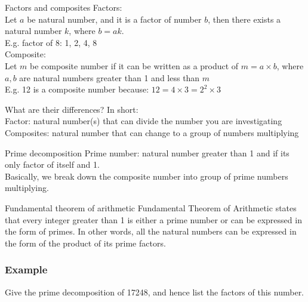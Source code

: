 \documentclass[
	11pt, %
]{beamer}
\begin{document}
\begin{frame}{Factors and composites}
    Factors:\\
    Let $a$ be natural number, and it is a factor of number $b$, then there exists a natural number $k$, where $b = ak$.\\
    \alert{E.g. factor of 8: 1, 2, 4, 8}\\
    Composite:\\
    Let $m$ be composite number if it can be written as a product of $m = a \times b$, where $a, b$ are natural numbers
    greater than 1 and less than $m$\\
    \alert{E.g. 12 is a composite number because: $12 = 4 \times 3 = 2^2 \times 3$}\\

    \begin{block}{What are their differences?}
        In short:\\
        Factor: natural number(s) that can divide the number you are investigating\\
        Composites: natural number that can change to a group of numbers multiplying\\
    \end{block}
\end{frame}

\begin{frame}{Prime decomposition}
    Prime number: natural number greater than 1 and if its only factor of itself and 1.\\
    Basically, we break down the composite number into group of prime numbers multiplying.\\
    \begin{block}{Fundamental theorem of arithmetic}
        Fundamental Theorem of Arithmetic states that every integer greater than 1 is either a prime number or can be expressed in the form of primes. 
        In other words, all the natural numbers can be expressed in the form of the product of its prime factors.
    \end{block}
\end{frame}

\begin{frame}[t]
    \frametitle{Example}
    Give the prime decomposition of 17248, and hence list the factors of this number.    
\end{frame}
\end{document}

